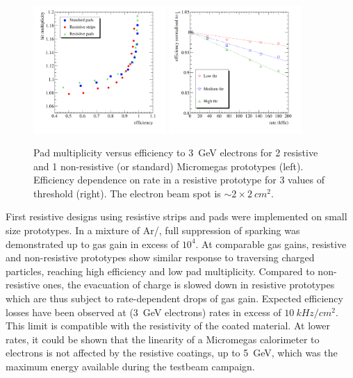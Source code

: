 \begin{figure}
\begin{centering}
\includegraphics[width=0.45\textwidth]{Calorimeter/SDHCal/splam_eff}
\includegraphics[width=0.45\textwidth]{Calorimeter/SDHCal/splam_rate}
\caption{Pad multiplicity versus efficiency to \SI{3}{GeV} electrons for 2 resistive and 1 non-resistive (or standard) Micromegas prototypes (left). Efficiency dependence on rate in a resistive prototype for 3 values of threshold (right). The electron beam spot is $\sim 2\times \SI{2}{cm^{2}}$.}
\label{resistive}
\end{centering}
\end{figure}

First resistive designs using resistive strips and pads were implemented on small size prototypes. In a mixture of Ar/, full suppression of sparking was demonstrated up to gas gain in excess of $10^{4}$. At comparable gas gains, resistive and non-resistive prototypes show similar response to traversing charged particles, reaching high efficiency and low pad multiplicity. Compared to non-resistive ones, the evacuation of charge is slowed down in resistive prototypes which are thus subject to rate-dependent drops of gas gain. Expected efficiency losses have been observed at (\SI{3}{GeV} electrons) rates in excess of $\SI{10}{kHz/cm^{2}}$. This limit is compatible with the resistivity of the coated material. At lower rates, it could be shown that the linearity of a Micromegas calorimeter to electrons is not affected by the resistive coatings, up to \SI{5}{GeV}, which was the maximum energy available during the testbeam campaign.

